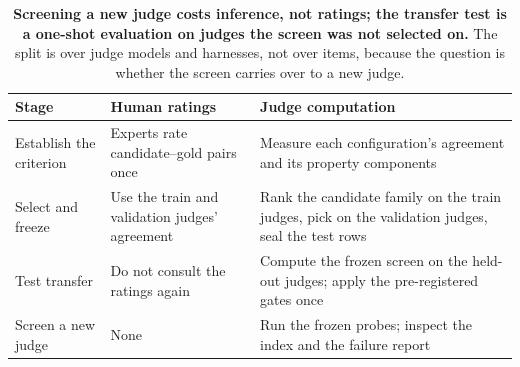 \begin{table}[t]
\centering\small
\begin{tabularx}{\linewidth}{@{}lXX@{}}
\toprule
Stage & Human ratings & Judge computation \\
\midrule
Establish the criterion & Experts rate candidate--gold pairs once & Measure each configuration's agreement and its property components \\
Select and freeze & Use the train and validation judges' agreement & Rank the candidate family on the train judges, pick on the validation judges, seal the test rows \\
Test transfer & Do not consult the ratings again & Compute the frozen screen on the held-out judges; apply the pre-registered gates once \\
Screen a new judge & None & Run the frozen probes; inspect the index and the failure report \\
\bottomrule
\end{tabularx}
\caption{\textbf{Screening a new judge costs inference, not ratings; the transfer test is a one-shot evaluation on judges the screen was not selected on.} The split is over judge models and harnesses, not over items, because the question is whether the screen carries over to a new judge.}
\label{tab:protocol_workflow}
\end{table}

